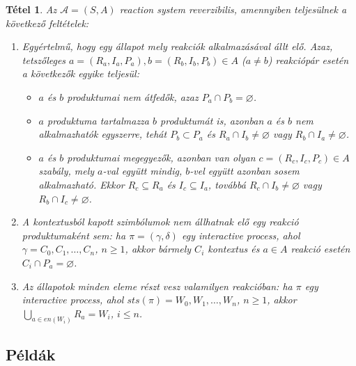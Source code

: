 \documentclass[12pt]{article}
\theoremstyle{definition}
\theoremstyle{remark}
\theoremstyle{plain}
\newtheorem*{theorem*}{Tétel}
\let\emptyset\varnothing
\begin{document}
    \begin{theorem*}
        Az $\mathscr{A} = (S, A)$ \textit{reaction system} reverzibilis, amennyiben teljesülnek a következő feltételek:
        \begin{enumerate}[label={(\arabic*)}]
            \item
            Egyértelmű, hogy egy állapot mely reakciók alkalmazásával állt elő. Azaz, tetszőleges $a = (R_{a}, I_{a}, P_{a}), b = (R_{b}, I_{b}, P_{b}) \in A$ ($a \neq b$) reakciópár esetén a következők egyike teljesül:
            \begin{itemize}
                \item
                $a$ és $b$ produktumai nem átfedők, azaz $P_{a} \cap P_{b} = \emptyset$.

                \item
                $a$ produktuma tartalmazza $b$ produktumát is, azonban $a$ és $b$ nem alkalmazhatók egyszerre, tehát $P_{b} \subset P_{a}$ és $R_{a} \cap I_{b} \neq \emptyset$ vagy $R_{b} \cap I_{a} \neq \emptyset$.

                \item
                $a$ és $b$ produktumai megegyezők, azonban van olyan $c = (R_{c}, I_{c}, P_{c}) \in A$ szabály, mely $a$-val együtt mindig, $b$-vel együtt azonban sosem alkalmazható. Ekkor $R_{c} \subseteq R_{a}$ és $I_{c} \subseteq I_{a}$, továbbá $R_{c} \cap I_{b} \neq \emptyset$ vagy $R_{b} \cap I_{c} \neq \emptyset$.
            \end{itemize} 

            \item
            A kontextusból kapott szimbólumok nem állhatnak elő egy reakció produktumaként sem: ha $\pi = (\gamma, \delta)$ egy \textit{interactive process}, ahol $\gamma = C_{0}, C_{1}, \ldots, C_{n}$, $n \geq 1$, akkor bármely $C_{i}$ kontextus és $a \in A$ reakció esetén $C_{i} \cap P_{a} = \emptyset$.

            \item
            Az állapotok minden eleme részt vesz valamilyen reakcióban: ha $\pi$ egy \textit{interactive process}, ahol $\textit{sts}(\pi) = W_{0}, W_{1}, \ldots, W_{n}$, $n \geq 1$, akkor $\bigcup_{a \in \textit{en}(W_{i})} R_{a} = W_{i}$, $i \leq n$.
        \end{enumerate}
    \end{theorem*}

    \subsection*{Példák}
\end{document}
